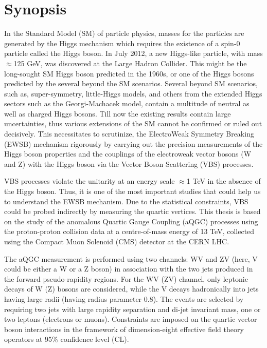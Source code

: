 \chapter*{Synopsis}
In the Standard Model (SM) of particle physics, masses for the particles are generated by the Higgs mechanism which requires the existence of a spin-0 particle called the Higgs boson. In July 2012, a new Higgs-like particle, with mass $\approx$125 GeV, was discovered at the Large Hadron Collider. This might be the long-sought SM Higgs boson predicted in the 1960s, or one of the Higgs bosons predicted by the several beyond the SM scenarios. Several beyond SM scenarios, such as, super-symmetry, little-Higgs models, and others from the extended Higgs sectors such as the Georgi-Machacek model, contain a multitude of neutral as well as charged Higgs bosons. Till now the existing results contain large uncertainties, thus various extensions of the SM cannot be confirmed or ruled out decisively.
This necessitates to scrutinize, the ElectroWeak Symmetry Breaking (EWSB) mechanism rigorously by carrying out the precision measurements of the Higgs boson properties and the couplings of the electroweak vector bosons (W and Z) with the Higgs boson via the Vector Boson Scattering (VBS) processes.

VBS processes violate the unitarity at an energy scale $\approx$1 TeV in the absence of the Higgs boson. Thus, it is one of the most important studies that could help us to understand the EWSB mechanism. Due to the statistical constraints, VBS could be probed indirectly by measuring the quartic vertices. This thesis is based on the study of the anomalous Quartic Gauge Coupling (aQGC) processes using the proton-proton collision data at a centre-of-mass energy of 13 TeV, collected using the Compact Muon Solenoid (CMS) detector at the CERN LHC.

The aQGC measurement is performed using two channels: WV and ZV (here, V could be either a W or a Z boson) in association with the two jets produced in the forward pseudo-rapidity regions. For the WV (ZV) channel, only leptonic decays of W (Z) bosons are considered, while the V decays hadronically into jets having large radii (having radius parameter 0.8). The events are selected by requiring two jets with large rapidity separation and di-jet invariant mass, one or two leptons (electrons or muons). Constraints are imposed on the quartic vector boson interactions in the framework of dimension-eight effective field theory operators at 95\% confidence level (CL).

